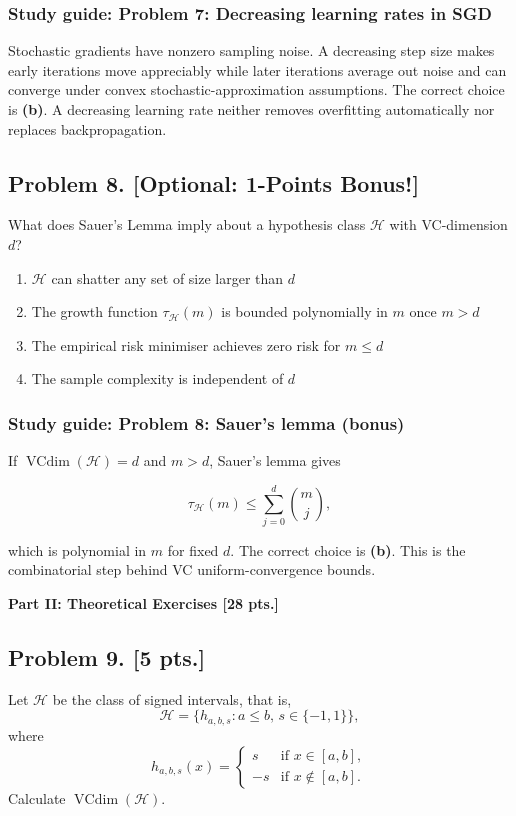 \documentclass[11pt,a4paper]{article}
\DeclareMathOperator{\VCdim}{VCdim}
\begin{document}
\subsubsection{Study guide: Problem 7: Decreasing learning rates in SGD}

Stochastic gradients have nonzero sampling noise. A decreasing step size makes early iterations move appreciably while later iterations average out noise and can converge under convex stochastic-approximation assumptions. The correct choice is \textbf{(b)}. A decreasing learning rate neither removes overfitting automatically nor replaces backpropagation.



\subsection{Problem 8. [Optional: 1-Points Bonus!]}
What does Sauer's Lemma imply about a hypothesis class $\mathcal{H}$ with VC-dimension $d$?
\begin{enumerate}[label=(\alph*)]
    \item $\mathcal{H}$ can shatter any set of size larger than $d$
    \item The growth function $\tau_{\mathcal{H}}(m)$ is bounded polynomially in $m$ once $m > d$
    \item The empirical risk minimiser achieves zero risk for $m \le d$
    \item The sample complexity is independent of $d$
\end{enumerate}


\subsubsection{Study guide: Problem 8: Sauer's lemma (bonus)}

If $\VCdim(\mathcal{H})=d$ and $m>d$, Sauer's lemma gives

\[
\tau_{\mathcal{H}}(m)
\leq
\sum_{j=0}^{d}\binom{m}{j},
\]

which is polynomial in $m$ for fixed $d$. The correct choice is \textbf{(b)}. This is the combinatorial step behind VC uniform-convergence bounds.


\noindent\textbf{Part II: Theoretical Exercises [28 pts.]}




\subsection{Problem 9. [5 pts.]}
Let $\mathcal{H}$ be the class of signed intervals, that is,
\[
\mathcal{H} = \{ h_{a,b,s} : a \le b,\, s \in \{-1, 1\} \},
\]
where
\[
h_{a,b,s}(x) =
\begin{cases}
s & \text{if } x \in [a, b], \\
-s & \text{if } x \notin [a, b].
\end{cases}
\]
Calculate $\VCdim(\mathcal{H})$.
\end{document}
